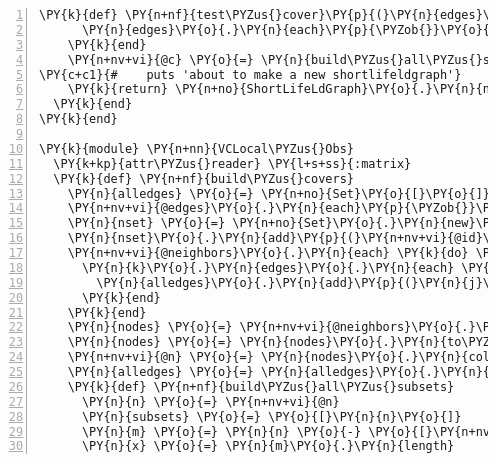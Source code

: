 \begin{Verbatim}[commandchars=\\\{\},numbers=left,firstnumber=1,stepnumber=1,xleftmargin=7mm, fontsize=\small]
    \PY{k}{def} \PY{n+nf}{test\PYZus{}cover}\PY{p}{(}\PY{n}{edges}\PY{p}{,} \PY{n}{cover}\PY{p}{)}
      \PY{n}{edges}\PY{o}{.}\PY{n}{each}\PY{p}{\PYZob{}}\PY{o}{|}\PY{n}{k}\PY{o}{|} \PY{k}{return} \PY{k+kp}{false} \PY{k}{if} \PY{n}{cover}\PY{o}{-}\PY{n}{k} \PY{o}{==} \PY{n}{cover}\PY{p}{\PYZcb{}} 
    \PY{k}{end}
    \PY{n+nv+vi}{@c} \PY{o}{=} \PY{n}{build\PYZus{}all\PYZus{}subsets}\PY{o}{.}\PY{n}{select}\PY{p}{\PYZob{}}\PY{o}{|}\PY{n}{k}\PY{o}{|} \PY{n}{test\PYZus{}cover}\PY{p}{(}\PY{n}{alledges}\PY{p}{,} \PY{n}{k}\PY{p}{)}\PY{p}{\PYZcb{}}\PY{o}{.}\PY{n}{to\PYZus{}set}
\PY{c+c1}{#    puts 'about to make a new shortlifeldgraph'}
    \PY{k}{return} \PY{n+no}{ShortLifeLdGraph}\PY{o}{.}\PY{n}{new}\PY{p}{(}\PY{n+nv+vi}{@c}\PY{p}{,} \PY{n}{nodes}\PY{p}{)}
  \PY{k}{end}  
\PY{k}{end}

\PY{k}{module} \PY{n+nn}{VCLocal\PYZus{}Obs}
  \PY{k+kp}{attr\PYZus{}reader} \PY{l+s+ss}{:matrix}
  \PY{k}{def} \PY{n+nf}{build\PYZus{}covers}
    \PY{n}{alledges} \PY{o}{=} \PY{n+no}{Set}\PY{o}{[}\PY{o}{]}
    \PY{n+nv+vi}{@edges}\PY{o}{.}\PY{n}{each}\PY{p}{\PYZob{}}\PY{o}{|}\PY{n}{k}\PY{o}{|} \PY{n}{alledges}\PY{o}{.}\PY{n}{add}\PY{p}{(}\PY{n}{k}\PY{p}{)}\PY{p}{\PYZcb{}}
    \PY{n}{nset} \PY{o}{=} \PY{n+no}{Set}\PY{o}{.}\PY{n}{new}\PY{p}{(}\PY{n+nv+vi}{@neighbors}\PY{o}{.}\PY{n}{collect}\PY{p}{\PYZob{}}\PY{o}{|}\PY{n}{k}\PY{o}{|} \PY{n}{k}\PY{o}{.}\PY{n}{id}\PY{p}{\PYZcb{}}\PY{p}{)}
    \PY{n}{nset}\PY{o}{.}\PY{n}{add}\PY{p}{(}\PY{n+nv+vi}{@id}\PY{p}{)}
    \PY{n+nv+vi}{@neighbors}\PY{o}{.}\PY{n}{each} \PY{k}{do} \PY{o}{|}\PY{n}{k}\PY{o}{|} 
      \PY{n}{k}\PY{o}{.}\PY{n}{edges}\PY{o}{.}\PY{n}{each} \PY{k}{do} \PY{o}{|}\PY{n}{j}\PY{o}{|} 
        \PY{n}{alledges}\PY{o}{.}\PY{n}{add}\PY{p}{(}\PY{n}{j}\PY{p}{)} \PY{k}{if} \PY{n}{j}\PY{o}{.}\PY{n}{proper\PYZus{}subset?}\PY{p}{(}\PY{n}{nset}\PY{p}{)}
      \PY{k}{end}
    \PY{k}{end}
    \PY{n}{nodes} \PY{o}{=} \PY{n+nv+vi}{@neighbors}\PY{o}{.}\PY{n}{to\PYZus{}set}\PY{o}{.}\PY{n}{add}\PY{p}{(}\PY{n+nb}{self}\PY{p}{)}
    \PY{n}{nodes} \PY{o}{=} \PY{n}{nodes}\PY{o}{.}\PY{n}{to\PYZus{}a}
    \PY{n+nv+vi}{@n} \PY{o}{=} \PY{n}{nodes}\PY{o}{.}\PY{n}{collect}\PY{p}{\PYZob{}}\PY{o}{|}\PY{n}{k}\PY{o}{|} \PY{n}{k}\PY{o}{.}\PY{n}{id}\PY{p}{\PYZcb{}}
    \PY{n}{alledges} \PY{o}{=} \PY{n}{alledges}\PY{o}{.}\PY{n}{to\PYZus{}a}    
    \PY{k}{def} \PY{n+nf}{build\PYZus{}all\PYZus{}subsets}
      \PY{n}{n} \PY{o}{=} \PY{n+nv+vi}{@n}
      \PY{n}{subsets} \PY{o}{=} \PY{o}{[}\PY{n}{n}\PY{o}{]}
      \PY{n}{m} \PY{o}{=} \PY{n}{n} \PY{o}{-} \PY{o}{[}\PY{n+nv+vi}{@id}\PY{o}{]}
      \PY{n}{x} \PY{o}{=} \PY{n}{m}\PY{o}{.}\PY{n}{length}

\end{Verbatim}
